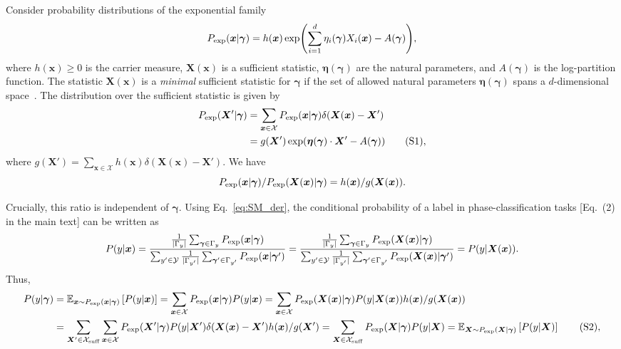 \documentclass[twocolumn,aps,pra,superscriptaddress,tightlines,nofootinbib]{revtex4-2}
\newcommand\numberthis{\addtocounter{equation}{1}\tag{\theequation}}
\begin{document}
	Consider probability distributions of the exponential family
	\begin{equation}\label{eq:SM_exp_fam}
		P_{\rm exp}(\bm{x}|\bm{\gamma}) = h(\bm{x})\exp(\sum_{i=1}^{d} \eta_{i}(\bm{\gamma}) X_{i}(\bm{x})-A(\bm{\gamma})),
	\end{equation}
	where $h(\bm{x})\geq 0$ is the carrier measure, $\bm{X}(\bm{x})$ is a sufficient statistic, $\bm{\eta}(\bm{\gamma})$ are the natural parameters, and $A(\bm{\gamma})$ is the log-partition function. The statistic $\bm{X}(\bm{x})$ is a \emph{minimal} sufficient statistic for $\bm{\gamma}$ if the set of allowed natural parameters $\bm{\eta}(\bm{\gamma})$ spans a $d$-dimensional space~\cite{casella:2002}. The distribution over the sufficient statistic is given by
	\begin{align*}
		P_{\rm exp}(\bm{X}'|\bm{\gamma}) &= \sum_{\bm{x} \in \mathcal{X}} P_{\rm exp}(\bm{x}|\bm{\gamma}) \delta(\bm{X}(\bm{x}) - \bm{X}')\\
		&= g(\bm{X}')\exp(\bm{\eta}(\bm{\gamma}) \cdot \bm{X}' - A(\bm{\gamma}))\numberthis,
	\end{align*}
	where $g(\bm{X}') = \sum_{\bm{x} \in \mathcal{X}} h(\bm{x})\delta(\bm{X}(\bm{x}) - \bm{X}')$. We have 
	\begin{equation}\label{eq:SM_der}
		P_{\rm exp}(\bm{x}|\bm{\gamma})/P_{\rm exp}(\bm{X}(\bm{x})|\bm{\gamma})=h(\bm{x})/g(\bm{X}(\bm{x})).
	\end{equation}
	\begin{widetext}
		Crucially, this ratio is independent of $\bm{\gamma}$. Using Eq.~\eqref{eq:SM_der}, the conditional probability of a label in phase-classification tasks [Eq.~(2) in the main text] can be written as
		\begin{equation}\label{eq:Bayes_2_SM}
			P(y|\bm{x}) =  \frac{\frac{1}{|\Gamma_{y}|}\sum_{\bm{\gamma} \in \Gamma_{y}} P_{\rm exp}(\bm{x}|\bm{\gamma})}{\sum_{y' \in \mathcal{Y}}\frac{1}{|\Gamma_{y'}|}\sum_{\bm{\gamma}' \in \Gamma_{y'}} P_{\rm exp}(\bm{x}|\bm{\gamma}')}
			=  \frac{\frac{1}{|\Gamma_{y}|}\sum_{\bm{\gamma} \in \Gamma_{y}} P_{\rm exp}(\bm{X}(\bm{x})|\bm{\gamma})}{\sum_{y' \in \mathcal{Y}}\frac{1}{|\Gamma_{y'}|}\sum_{\bm{\gamma}' \in \Gamma_{y'}} P_{\rm exp}(\bm{X}(\bm{x})|\bm{\gamma}')}
			= P(y|\bm{X}(\bm{x})).
		\end{equation}
		Thus,
		\begin{align*}\label{eq:SM_der_1}
			P(y|\bm{\gamma}) &= \mathbb{E}_{\bm{x} \sim P_{\rm exp}(\bm{x}|\bm{\gamma})}\left[ P(y|\bm{x}) \right] =  \sum_{\bm{x} \in \mathcal{X}} P_{\rm exp}(\bm{x}|\bm{\gamma})  P(y|\bm{x}) = \sum_{\bm{x} \in \mathcal{X}}  P_{\rm exp}(\bm{X}(\bm{x})|\bm{\gamma})  P(y|\bm{X}(\bm{x})) h(\bm{x})/g(\bm{X}(\bm{x}))\\
			&= \sum_{\bm{X}' \in \mathcal{X}_{\rm suff}}\sum_{\bm{x} \in \mathcal{X}} P_{\rm exp}(\bm{X}'|\bm{\gamma})  P(y|\bm{X}') \delta(\bm{X}(\bm{x})-\bm{X}') h(\bm{x})/g(\bm{X}')= \sum_{\bm{X} \in \mathcal{X}_{\rm suff}} P_{\rm exp}(\bm{X}|\bm{\gamma})  P(y|\bm{X}) = \mathbb{E}_{\bm{X} \sim P_{\rm exp}(\bm{X}|\bm{\gamma})}\left[  P(y|\bm{X})\right] \numberthis, \\
		\end{align*}
	\end{widetext}
\end{document}
